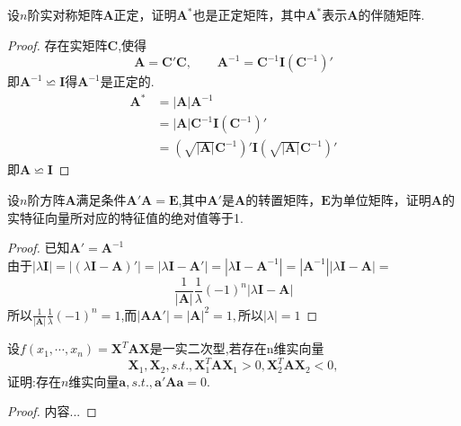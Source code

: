 \documentclass[lang=cn,11pt,normal]{elegantbook}
\begin{document}
	\begin{exercise}
		设$n$阶实对称矩阵$\boldsymbol{A}$正定，证明$\boldsymbol{A}^*$也是正定矩阵，其中$\boldsymbol{A}^*$表示$\boldsymbol{A}$的伴随矩阵.
	\end{exercise}
	\begin{proof}
		存在实矩阵$\boldsymbol{C}$,使得
		$$\boldsymbol{A}=\boldsymbol{C}'\boldsymbol{C},\qquad\boldsymbol{A}^{-1}=\boldsymbol{C}^{-1}\boldsymbol{I}(\boldsymbol{C}^{-1})'
		$$
		即$\boldsymbol{A}^{-1}\backsimeq\boldsymbol{I}$得$\boldsymbol{A}^{-1}$是正定的.\\
		$$
		\begin{aligned}
		\boldsymbol{A}^*&=|\boldsymbol{A}|\boldsymbol{A}^{-1}\\
		&=|\boldsymbol{A}|\boldsymbol{C}^{-1}\boldsymbol{I}(\boldsymbol{C}^{-1})'\\
		&=(\sqrt{|\boldsymbol{A}|}\boldsymbol{C}^{-1})'\boldsymbol{I}(\sqrt{|\boldsymbol{A}|}\boldsymbol{C}^{-1})'
		\end{aligned}
		$$
		即$\boldsymbol{A}\backsimeq\boldsymbol{I}$
	\end{proof}
	\begin{exercise}
		设$n$阶方阵$\boldsymbol{A}$满足条件$\boldsymbol{A}'\boldsymbol{A}=\boldsymbol{E}$,其中$\boldsymbol{A}'$是$\boldsymbol{A}$的转置矩阵，$\boldsymbol{E}$为单位矩阵，证明$\boldsymbol{A}$的实特征向量所对应的特征值的绝对值等于1.
	\end{exercise}
	\begin{proof}
		已知$\boldsymbol{A}'=\boldsymbol{A}^{-1}$\\
		由于$|\lambda\boldsymbol{I}|=|(\lambda\boldsymbol{I}-\boldsymbol{A})'|=|\lambda\boldsymbol{I}-\boldsymbol{A}'|=|\lambda\boldsymbol{I}-\boldsymbol{A}^{-1}|=|\boldsymbol{A}^{-1}||\lambda\boldsymbol{I}-\boldsymbol{A}|=$
		$$
		\frac{1}{|\boldsymbol{A}|}\frac{1}{\lambda}(-1)^n|\lambda\boldsymbol{I}-\boldsymbol{A}|
		$$
		所以$\frac{1}{|\boldsymbol{A}|}\frac{1}{\lambda}(-1)^n=1$,而$|\boldsymbol{AA}'|=|\boldsymbol{A}|^2=1,$所以$|\lambda|=1$
	\end{proof}
	\begin{exercise}
		设$f(x_1,\cdots,x_n)=\boldsymbol{X}^T\boldsymbol{AX}$是一实二次型,若存在n维实向量
		$$
		\boldsymbol{X}_1,\boldsymbol{X}_2,s.t.,\boldsymbol{X}_1^T\boldsymbol{AX}_1>0,\boldsymbol{X}_2^T\boldsymbol{AX}_2<0,
		$$
		证明:存在$n$维实向量$\boldsymbol{a},s.t.,\boldsymbol{a}'\boldsymbol{A}\boldsymbol{a}=0.$
	\end{exercise}
	\begin{proof}
		内容...
	\end{proof}
\end{document}

